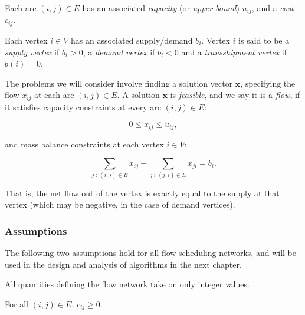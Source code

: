 Each arc $(i,j)\in E$ has an associated \emph{capacity} (or \emph{upper	bound}\footnotemark) $u_{ij}$, and a \emph{cost} $c_{ij}$.

Each vertex $i\in V$ has an associated supply/demand $b_{i}$. Vertex $i$ is said to be a \emph{supply vertex} if $b_{i}>0$, a \emph{demand vertex} if $b_{i}<0$ and a \emph{transshipment vertex} if $b(i)=0$.

The problems we will consider involve finding a solution vector $\mathbf{x}$,
specifying the flow $x_{ij}$ at each arc $(i,j)\in E$. A solution
$\mathbf{x}$ is \emph{feasible}, and we say it is a \emph{flow}, if it satisfies capacity constraints at every arc $(i,j) \in E$:

\begin{equation} \label{eq:capacity-constraints}
0\leq x_{ij}\leq u_{ij},
\end{equation}

and mass balance constraints at each vertex $i \in V$:

\begin{equation} \label{eq:mass-balance-constraints}
\sum_{j\::\:(i,j)\in E}x_{ij}-\sum_{j\::\:(j,i)\in E}x_{ji}=b_i.
\end{equation}

That is, the net flow out of the vertex is exactly equal to the supply
at that vertex (which may be negative, in the case of demand vertices).

\subsubsection{Assumptions}

The following two assumptions hold for all flow scheduling networks, and will be used in the design and analysis of algorithms in the next chapter. \\

\begin{assumption}[Integrality] \label{assumption:integrality}
All quantities defining the flow network take on only integer values.\\
\end{assumption}

\begin{assumption} \label{assumption:non-negative-arc-costs}
For all $(i,j) \in E$, $c_{ij} \geq 0$. \\
\end{assumption}

